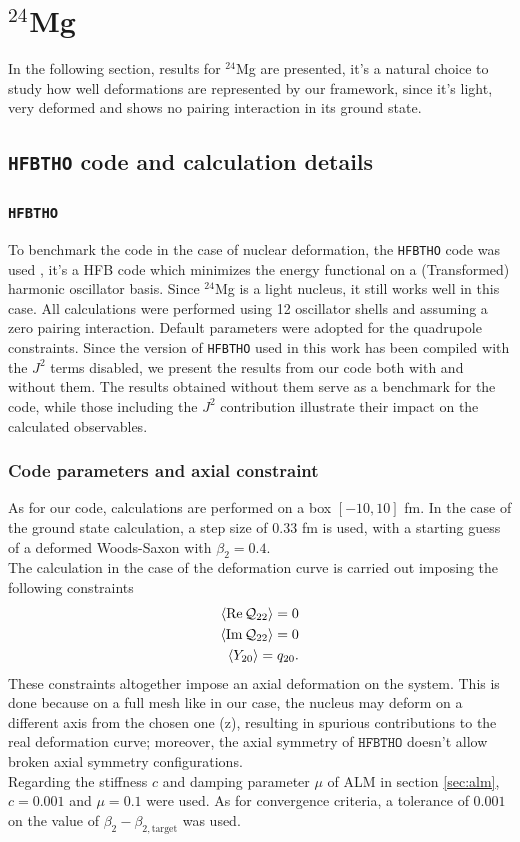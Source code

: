 \section{$^{24}$Mg}
In the following section, results for $^{24}$Mg are presented, it's a natural choice to study how well deformations are represented by our framework, since it's light, very deformed and shows no pairing interaction in its ground state.
\subsection{\texttt{HFBTHO} code and calculation details}
\label{sec:hfbtho}
\subsubsection{\texttt{HFBTHO}}
To benchmark the code in the case of nuclear deformation, the \texttt{HFBTHO} code was used \cite{MAREVIC2022108367}, it's a HFB code which minimizes the energy functional on a (Transformed) harmonic oscillator basis. Since $^{24}$Mg is a light nucleus, it still works well in this case.
All calculations were performed using 12 oscillator shells and assuming a zero pairing interaction. 
Default parameters were adopted for the quadrupole constraints. 
Since the version of \texttt{HFBTHO} used in this work has been compiled with the $J^2$ terms disabled, we present the results from our code both with and without them. 
The results obtained without them serve as a benchmark for the code, 
while those including the $J^2$ contribution illustrate their impact on the calculated observables.
\subsubsection{Code parameters and axial constraint}
As for our code, calculations are performed on a box $[-10, 10]$ fm.
In the case of the ground state calculation, a step size of $0.33$ fm is used, with a starting guess of a deformed Woods-Saxon with $\beta_2=0.4$.
\\The calculation in the case of the deformation curve is carried out imposing the following constraints
\begin{align}
  \expval{\Re\mathcal Q_{22}} = 0
  \\\expval{\Im \mathcal Q_{22}} = 0
  \\\expval{Y_{20}} = q_{20}.
\end{align}
These constraints altogether impose an axial deformation on the system. This is done because on a full mesh like in our case, the nucleus may deform on a different axis from the chosen one (z), resulting in spurious contributions to the real deformation curve; moreover, the axial symmetry of $\texttt{HFBTHO}$ doesn't allow broken axial symmetry configurations.
\\Regarding the stiffness $c$ and damping parameter $\mu$ of ALM in section \ref{sec:alm}, $c=0.001$ and $\mu=0.1$ were used. As for convergence criteria, a tolerance of $0.001$ on the value of $\beta_2 - \beta_{2, \text{target}}$ was used.
